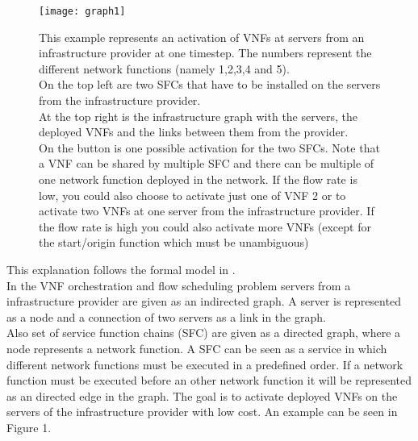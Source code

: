 \begin{figure*}[t]
\label{fig:graph}
\centering
\texttt{[image: graph1]}
\caption{This example represents an activation of VNFs at servers from an infrastructure provider at one timestep. The numbers represent the different network functions (namely 1,2,3,4 and 5).\\ On the top left are two SFCs that have to be installed on the servers from the infrastructure provider.\\ At the top right is the infrastructure graph with the servers, the deployed VNFs and the links between them from the provider. \\ On the button is one possible activation for the two SFCs. Note that a VNF can be shared by multiple SFC and there can be multiple of one network function deployed in the network. If the flow rate is low, you could also choose to activate just one of VNF 2 or to activate two VNFs at one server from the infrastructure provider. If the flow rate is high you could also activate more VNFs (except for the start/origin function which must be unambiguous)}
\end{figure*}

This explanation follows the formal model in \cite{Gu}.\\
In the VNF orchestration and flow scheduling problem servers from a infrastructure provider are given as an indirected graph. A server is represented as a node and a connection of two servers as a link in the graph.\\
 Also set of service function chains (SFC) are given as a directed graph, where a node represents a network function. A SFC can be seen as a service in which different network functions must be executed in a predefined order. If a network function must be executed before an other network function it will be represented as an directed edge in the graph. The goal is to activate deployed VNFs on the servers of the infrastructure provider with low cost. An example can be seen in Figure 1.\\%


